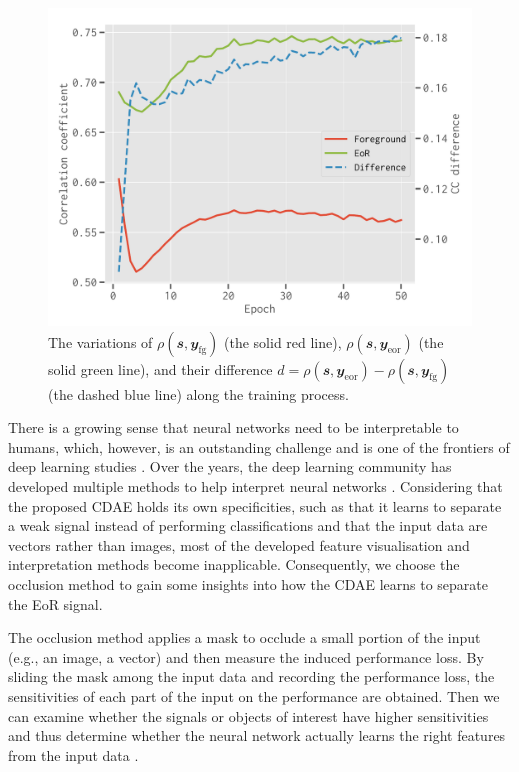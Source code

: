 \documentclass[fleqn,usenatbib]{mnras}
\newlength{\myfigwidth}
\newcommand{\R}[1]{\mathrm{#1}}
\newcommand{\B}[1]{\mathbfit{#1}}
\newcommand{\editwip}[1]{{\leavevmode\color{magenta}#1}}
\begin{document}
{\begin{figure}
  \centering
  \includegraphics[width=\myfigwidth]{occlusion-epoch}
  \caption{\label{fig:occ-epoch}\editwip{%
    The variations of $\rho(\B{s}, \B{y}_{\R{fg}})$ (the solid red line),
    $\rho(\B{s}, \B{y}_{\R{eor}})$ (the solid green line), and their difference
    $d = \rho(\B{s}, \B{y}_{\R{eor}}) - \rho(\B{s}, \B{y}_{\R{fg}})$
    (the dashed blue line) along the training process.
  }}
\end{figure}

There is a growing sense that neural networks need to be interpretable to
humans, which, however, is an outstanding challenge and is one of the
frontiers of deep learning studies
\citep[see][for recent reviews]{olah2017,olah2018}.
Over the years, the deep learning community has developed multiple methods
to help interpret neural networks
\citep[e.g.,][]{simonyan2013,zeiler2014,mahendran2015,springenberg2015}.
Considering that the proposed CDAE holds its own specificities, such as
that it learns to separate a weak signal instead of performing
classifications and that the input data are vectors rather than images,
most of the developed feature visualisation and interpretation methods
become inapplicable.
Consequently, we choose the occlusion method \citep{zeiler2014} to gain
some insights into how the CDAE learns to separate the EoR signal.

The occlusion method applies a mask to occlude a small portion of the input
(e.g., an image, a vector) and then measure the induced performance loss.
By sliding the mask among the input data and recording the performance
loss, the sensitivities of each part of the input on the performance are
obtained.
Then we can examine whether the signals or objects of interest have higher
sensitivities and thus determine whether the neural network actually learns
the right features from the input data \citep{zeiler2014}.

}
\end{document}
